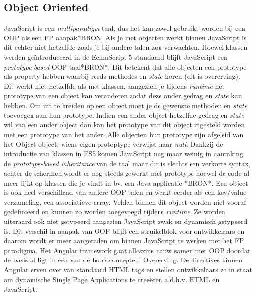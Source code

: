 \subsection{Object Oriented}
JavaScript is een \textit{multiparadigm} taal, dus het kan zowel gebruikt worden bij een OOP als een FP aanpak*BRON. Als je met objecten werkt binnen JavaScript is dit echter niet hetzelfde zoals je bij andere talen zou verwachten. Hoewel klassen werden geïntroduceerd in de EcmaScript 5 standaard blijft JavaScript een \textit{prototype based} OOP taal*BRON*. Dit betekent dat alle objecten een prototype als property hebben waarbij reeds methodes en \textit{state} horen (dit is overerving). Dit werkt niet hetzelfde als met klassen, aangezien je tijdens \textit{runtime} het prototype van een object kan veranderen zodat deze ander gedrag en \textit{state} kan hebben. Om uit te breiden op een object moet je de gewenste methoden en \textit{state} toevoegen aan hun prototype. Indien een ander object hetzelfde gedrag en \textit{state} wil van een ander object dan kan het prototype van dit object ingesteld worden met een prototype van het ander. Alle objecten hun prototype zijn afgeleid van het Object object, wiens eigen protoptype verwijst naar \textit{null}. Dankzij de introductie van klassen in ES5 komen JavaScript nog maar weinig in aanraking de \textit{prototype-based inheritance} van de taal maar dit is slechts een verkorte syntax, achter de schermen wordt er nog steeds gewerkt met prototype hoewel de code al meer lijkt op klassen die je vindt in bv. een Java applicatie *BRON*. Een object is ook heel verschillend van andere OOP talen en werkt eerder als een key/value verzameling, een associatieve array. Velden binnen dit object worden niet vooraf gedefinieerd en kunnen zo worden toegevoegd tijdens \textit{runtime}. Ze worden uiteraard ook niet getypeerd aangezien JavaScript zwak en dynamisch getypeerd is. Dit verschil in aanpak van OOP blijft een struikelblok voor ontwikkelaars en daarom wordt er meer aangeraden om binnen JavaScript te werken met het FP paradigma. Het Angular framework gaat alleszins nauw samen met OOP doordat de basis al ligt in één van de hoofdconcepten: Overerving. De directives binnen Angular erven over van standaard HTML tags en stellen ontwikkelaars zo in staat om dynamische Single Page Applications te creeëren a.d.h.v. HTML en JavaScript.

